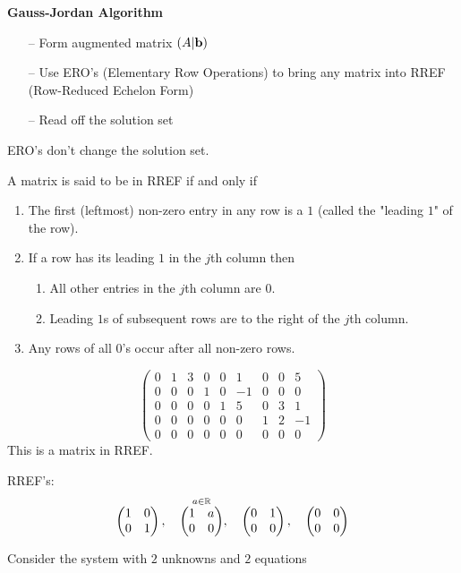 \documentclass[10pt, a4paper]{article}
\begin{document}
\textbf{Gauss-Jordan Algorithm}
\begin{itemize}
    \item[--] Form augmented matrix $(A|\mathbf{b})$
    \item[--] Use ERO's (Elementary Row Operations) to bring any matrix into RREF (Row-Reduced Echelon Form)
    \item[--] Read off the solution set
\end{itemize}

ERO's don't change the solution set.

\begin{definition}
    A matrix is said to be in RREF if and only if
    \begin{enumerate}[label = (\roman*)]
        \item The first (leftmost) non-zero entry in any row is a $1$ (called the "leading $1$" of the row).
        \item If a row has its leading $1$ in the $j$th column then
        \begin{enumerate}[label = (\alph*)]
            \item All other entries in the $j$th column are $0$.
            \item Leading $1$s of subsequent rows are to the right of the $j$th column.
        \end{enumerate}
        \item Any rows of all $0$'s occur after all non-zero rows.
    \end{enumerate}
\end{definition}

\begin{example}
    \[
    \begin{pmatrix}
        0 & 1 & 3 & 0 & 0 & 1 & 0 & 0 & 5 \\
        0 & 0 & 0 & 1 & 0 & -1 & 0 & 0 & 0 \\
        0 & 0 & 0 & 0 & 1 & 5 & 0 & 3 & 1 \\
        0 & 0 & 0 & 0 & 0 & 0 & 1 & 2 & -1 \\
        0 & 0 & 0 & 0 & 0 & 0 & 0 & 0 & 0
    \end{pmatrix}
    \]
    This is a matrix in RREF.
\end{example}

\begin{example}
    RREF's:
    \[
    \begin{pmatrix}
        1 & 0 \\ 0 & 1
    \end{pmatrix},
    \quad
    \overset{a \in \mathbb{R}}{
    \begin{pmatrix}
        1 & a \\ 0 & 0
    \end{pmatrix}},
    \quad
    \begin{pmatrix}
        0 & 1 \\ 0 & 0
    \end{pmatrix},
    \quad
    \begin{pmatrix}
        0 & 0 \\ 0 & 0
    \end{pmatrix}
    \]
\end{example}
Consider the system with $2$ unknowns and $2$ equations
\end{document}
